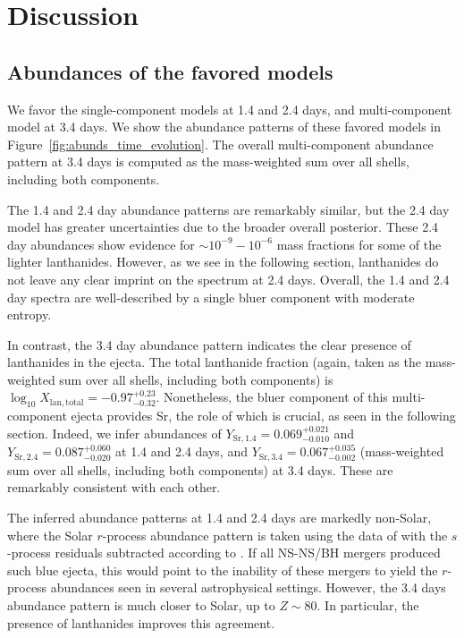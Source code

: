 \documentclass[twocolumn,twocolappendix]{aastex63}
\begin{document}

\section{Discussion}\label{sec:disco}

\subsection{Abundances of the favored models}\label{ssc:disco-abundances}

We favor the single-component models at 1.4 and 2.4 days, and multi-component model at 3.4 days. We show the abundance patterns of these favored models in Figure~\ref{fig:abunds_time_evolution}. The overall multi-component abundance pattern at 3.4 days is computed as the mass-weighted sum over all shells, including both components. 

The 1.4 and 2.4 day abundance patterns are remarkably similar, but the 2.4 day model has greater uncertainties due to the broader overall posterior. These 2.4 day abundances show evidence for $\sim 10^{-9} - 10^{-6}$ mass fractions for some of the lighter lanthanides. However, as we see in the following section, lanthanides do not leave any clear imprint on the spectrum at 2.4 days. Overall, the 1.4 and 2.4 day spectra are well-described by a single bluer component with moderate entropy. 

In contrast, the 3.4 day abundance pattern indicates the clear presence of lanthanides in the ejecta. The total lanthanide fraction (again, taken as the mass-weighted sum over all shells, including both components) is $\log_{10} X_{\mathrm{lan,total}} = -0.97^{+0.23}_{-0.32}$. Nonetheless, the bluer component of this multi-component ejecta provides Sr, the role of which is crucial, as seen in the following section. Indeed, we infer abundances of $Y_{\mathrm{Sr},1.4} = 0.069^{+0.021}_{-0.010}$ and $Y_{\mathrm{Sr},2.4} = 0.087^{+0.060}_{-0.020}$ at 1.4 and 2.4 days, and $Y_{\mathrm{Sr},3.4} = 0.067^{+0.035}_{-0.002}$ (mass-weighted sum over all shells, including both components) at 3.4 days. These are remarkably consistent with each other.

The inferred abundance patterns at 1.4 and 2.4 days are markedly non-Solar, where the Solar $r$-process abundance pattern is taken using the data of \cite{lodders09} with the $s$-process residuals subtracted according to \cite{bisterzo14}. If all NS-NS/BH mergers produced such blue ejecta, this would point to the inability of these mergers to yield the $r$-process abundances seen in several astrophysical settings. However, the 3.4 days abundance pattern is much closer to Solar, up to $Z \sim 80$. In particular, the presence of lanthanides improves this agreement. %
\end{document}
